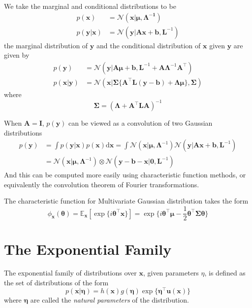 \documentclass[a4paper]{book}
\newcommand{\ud}{\mathrm{d}}
\renewcommand{\bf}{\mathbf}
\renewcommand{\cal}{\mathcal}
\newcommand{\bb}{\mathbb}
\begin{document}
We take the marginal and conditional distributions to be
\begin{align}
	p(\bf{x}) &= \cal{N}(\bf{x}|\boldsymbol{\mu,\Lambda^{-1}})\\
	p(\bf{y}|\bf{x}) &= \cal{N}(\bf{y}|\bf{Ax}+\bf{b},\bf{L}^{-1})
\end{align}
the marginal distribution of $\bf{y}$ and the conditional distribution of $\bf{x}$ given $\bf{y}$ are given by
\begin{align}
	p(\bf{y})&=\cal{N}(\bf{y}|\bf{A}\boldsymbol{\mu}+\bf{b},\bf{L}^{-1}+\bf{A}\boldsymbol{\Lambda}^{-1}\bf{A}^{\intercal})\\
	p(\bf{x}|\bf{y})&=\cal{N}(\bf{x}|\boldsymbol{\Sigma}\{\bf{A}^{\intercal}\bf{L(y-b)}+\boldsymbol{\Lambda\mu}\},\boldsymbol{\Sigma})
\end{align}
where 
\begin{equation}
	\boldsymbol\Sigma = (\boldsymbol{\Lambda}+\bf{A}^{\intercal}\bf{LA})^{-1}
\end{equation}

When $\bf{A=I}$, $p(\bf{y})$ can be viewed as a convolution of two Gaussian distributions
\begin{align}
	p(\bf{y})&=\int p(\bf{y}|\bf{x})p(\bf{x}) \ud \bf{x}=\int \cal{N}(\bf{x}|\boldsymbol{\mu,\Lambda}^{-1})\cal{N}(\bf{y}|\bf{Ax+b},\bf{L}^{-1})\\
	&=\cal{N}(\bf{x}|\boldsymbol{\mu,\Lambda}^{-1})\otimes\cal{N}(\bf{y-b-x}|\bf{0},\bf{L}^{-1})
\end{align}
And this can be computed more easily using characteristic function methods, or equivalently the convolution theorem of Fourier transformations.

The characteristic function for Multivariate Gaussian distribution takes the form
\begin{equation}
	\phi_{\bf{x}}(\boldsymbol{\theta})=\bb{E}_{\bf{x}}[\exp\{i \boldsymbol{\theta}^{\intercal}\bf{x}\}]=\exp\{i \boldsymbol{\theta}^{\intercal}\boldsymbol{\mu}-\frac{1}{2} \boldsymbol{\theta}^{\intercal}\boldsymbol{\Sigma \theta} \}
\end{equation}
\section{The Exponential Family}
The exponential family of distributions over $\bf{x}$, given parameters $\eta$, is defined as the set of distributions of the form
\begin{equation}
	p(\bf{x}|\boldsymbol{\eta})=h(\bf{x})g(\boldsymbol{\eta})\exp\{\boldsymbol{\eta}^{\intercal}\bf{u(x)}\}
\end{equation}
where $\boldsymbol\eta$ are called the \emph{natural parameters} of the distribution. 
\end{document}
